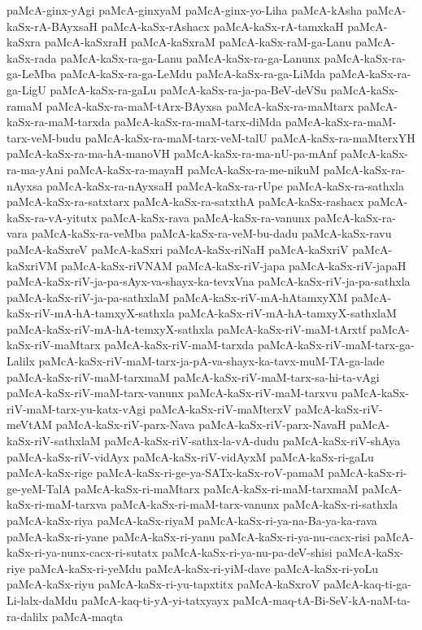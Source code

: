 {paMcA-ginx-yAgi
paMcA-ginxyaM
paMcA-ginx-yo-Liha
paMcA-kAsha
paMcA-kaSx-rA-BAyxsaH
paMcA-kaSx-rAshacx
paMcA-kaSx-rA-tamxkaH
paMcA-kaSxra
paMcA-kaSxraH
paMcA-kaSxraM
paMcA-kaSx-raM-ga-Lanu
paMcA-kaSx-rada
paMcA-kaSx-ra-ga-Lanu
paMcA-kaSx-ra-ga-Lanunx
paMcA-kaSx-ra-ga-LeMba
paMcA-kaSx-ra-ga-LeMdu
paMcA-kaSx-ra-ga-LiMda
paMcA-kaSx-ra-ga-LigU
paMcA-kaSx-ra-gaLu
paMcA-kaSx-ra-ja-pa-BeV-deVSu
paMcA-kaSx-ramaM
paMcA-kaSx-ra-maM-tArx-BAyxsa
paMcA-kaSx-ra-maMtarx
paMcA-kaSx-ra-maM-tarxda
paMcA-kaSx-ra-maM-tarx-diMda
paMcA-kaSx-ra-maM-tarx-veM-budu
paMcA-kaSx-ra-maM-tarx-veM-talU
paMcA-kaSx-ra-maMterxYH
paMcA-kaSx-ra-ma-hA-manoVH
paMcA-kaSx-ra-ma-nU-pa-mAnf
paMcA-kaSx-ra-ma-yAni
paMcA-kaSx-ra-mayaH
paMcA-kaSx-ra-me-nikuM
paMcA-kaSx-ra-nAyxsa
paMcA-kaSx-ra-nAyxsaH
paMcA-kaSx-ra-rUpe
paMcA-kaSx-ra-sathxla
paMcA-kaSx-ra-satxtarx
paMcA-kaSx-ra-satxthA
paMcA-kaSx-rashacx
paMcA-kaSx-ra-vA-yitutx
paMcA-kaSx-rava
paMcA-kaSx-ra-vanunx
paMcA-kaSx-ra-vara
paMcA-kaSx-ra-veMba
paMcA-kaSx-ra-veM-bu-dadu
paMcA-kaSx-ravu
paMcA-kaSxreV
paMcA-kaSxri
paMcA-kaSx-riNaH
paMcA-kaSxriV
paMcA-kaSxriVM
paMcA-kaSx-riVNAM
paMcA-kaSx-riV-japa
paMcA-kaSx-riV-japaH
paMcA-kaSx-riV-ja-pa-sAyx-va-shayx-ka-tevxVna
paMcA-kaSx-riV-ja-pa-sathxla
paMcA-kaSx-riV-ja-pa-sathxlaM
paMcA-kaSx-riV-mA-hAtamxyXM
paMcA-kaSx-riV-mA-hA-tamxyX-sathxla
paMcA-kaSx-riV-mA-hA-tamxyX-sathxlaM
paMcA-kaSx-riV-mA-hA-temxyX-sathxla
paMcA-kaSx-riV-maM-tArxtf
paMcA-kaSx-riV-maMtarx
paMcA-kaSx-riV-maM-tarxda
paMcA-kaSx-riV-maM-tarx-ga-Lalilx
paMcA-kaSx-riV-maM-tarx-ja-pA-va-shayx-ka-tavx-muM-TA-ga-lade
paMcA-kaSx-riV-maM-tarxmaM
paMcA-kaSx-riV-maM-tarx-sa-hi-ta-vAgi
paMcA-kaSx-riV-maM-tarx-vanunx
paMcA-kaSx-riV-maM-tarxvu
paMcA-kaSx-riV-maM-tarx-yu-katx-vAgi
paMcA-kaSx-riV-maMterxV
paMcA-kaSx-riV-meVtAM
paMcA-kaSx-riV-parx-Nava
paMcA-kaSx-riV-parx-NavaH
paMcA-kaSx-riV-sathxlaM
paMcA-kaSx-riV-sathx-la-vA-dudu
paMcA-kaSx-riV-shAya
paMcA-kaSx-riV-vidAyx
paMcA-kaSx-riV-vidAyxM
paMcA-kaSx-ri-gaLu
paMcA-kaSx-rige
paMcA-kaSx-ri-ge-ya-SATx-kaSx-roV-pamaM
paMcA-kaSx-ri-ge-yeM-TalA
paMcA-kaSx-ri-maMtarx
paMcA-kaSx-ri-maM-tarxmaM
paMcA-kaSx-ri-maM-tarxva
paMcA-kaSx-ri-maM-tarx-vanunx
paMcA-kaSx-ri-sathxla
paMcA-kaSx-riya
paMcA-kaSx-riyaM
paMcA-kaSx-ri-ya-na-Ba-ya-ka-rava
paMcA-kaSx-ri-yane
paMcA-kaSx-ri-yanu
paMcA-kaSx-ri-ya-nu-cacx-risi
paMcA-kaSx-ri-ya-nunx-cacx-ri-sutatx
paMcA-kaSx-ri-ya-nu-pa-deV-shisi
paMcA-kaSx-riye
paMcA-kaSx-ri-yeMdu
paMcA-kaSx-ri-yiM-dave
paMcA-kaSx-ri-yoLu
paMcA-kaSx-riyu
paMcA-kaSx-ri-yu-tapxtitx
paMcA-kaSxroV
paMcA-kaq-ti-ga-Li-lalx-daMdu
paMcA-kaq-ti-yA-yi-tatxyayx
paMcA-maq-tA-Bi-SeV-kA-naM-ta-ra-dalilx
paMcA-maqta
}
